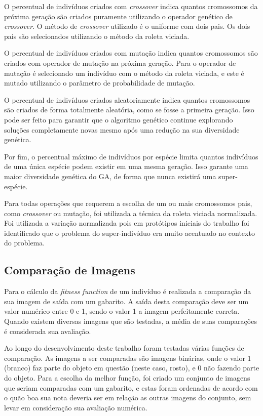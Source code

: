 \documentclass[12pt,oneside,a4paper,english,french,spanish,brazil,]{abntex2}
\begin{document}
O percentual de indivíduos criados com \textit{crossover} indica quantos cromossomos da próxima geração são criados puramente utilizando o operador genético de \textit{crossover}. O método de \textit{crossover} utilizado é o uniforme com dois pais. Os dois pais são selecionados utilizando o método da roleta viciada.

O percentual de indivíduos criados com mutação indica quantos cromossomos são criados com operador de mutação na próxima geração. Para o operador de mutação é selecionado um indivíduo com o método da roleta viciada, e este é mutado utilizando o parâmetro de probabilidade de mutação.

O percentual de indivíduos criados aleatoriamente indica quantos cromossomos são criados de forma totalmente aleatória, como se fosse a primeira geração. Isso pode ser feito para garantir que o algoritmo genético continue explorando soluções completamente novas mesmo após uma redução na sua diversidade genética.

Por fim, o percentual máximo de indivíduos por espécie limita quantos indivíduos de uma única espécie podem existir em uma mesma geração. Isso garante uma maior diversidade genética do GA, de forma que nunca existirá uma super-espécie.

Para todas operações que requerem a escolha de um ou mais cromossomos pais, como \textit{crossover} ou mutação, foi utilizada a técnica da roleta viciada normalizada. Foi utilizada a variação normalizada pois em protótipos iniciais do trabalho foi identificado que o problema do super-indivíduo era muito acentuado no contexto do problema.

\subsection{Comparação de Imagens}

Para o cálculo da \textit{fitness function} de um indivíduo é realizada a comparação da sua imagem de saída com um gabarito. A saída desta comparação deve ser um valor numérico entre 0 e 1, sendo o valor 1 a imagem perfeitamente correta. Quando existem diversas imagens que são testadas, a média de suas comparações é considerada sua avaliação.

Ao longo do desenvolvimento deste trabalho foram testadas várias funções de comparação. As imagens a ser comparadas são imagens binárias, onde o valor 1 (branco) faz parte do objeto em questão (neste caso, rosto), e 0 não fazendo parte do objeto. Para a escolha da melhor função, foi criado um conjunto de imagens que seriam comparadas com um gabarito, e estas foram ordenadas de acordo com o quão boa sua nota deveria ser em relação as outras imagens do conjunto, sem levar em consideração sua avaliação numérica.
\end{document}
